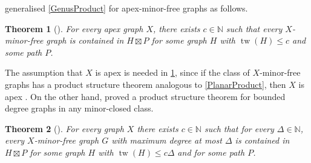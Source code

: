 \documentclass{patmorin}
\theoremstyle{plain}
\newtheorem{thm}{Theorem}
\theoremstyle{definition}
\newcommand{\note}[2]{\noindent{\color{red}[#1:~#2]}}
\DeclareMathOperator{\tw}{tw}
\renewcommand{\SS}{\mathcal{S}}
\renewcommand{\geq}{\geqslant}
\renewcommand{\leq}{\leqslant}
\begin{document}
\citet{DJMMUW20} generalised \cref{GenusProduct} for apex-minor-free graphs as follows.

\begin{thm}[\citep{DJMMUW20}]
\label{ApexMinorFree}
For every apex graph $X$, there exists $c\in\mathbb{N}$ such that every $X$-minor-free graph is contained in $H\boxtimes P$ for some graph $H$ with $\tw(H)\leq c$ and some path $P$.
\end{thm}

The assumption that $X$ is apex is needed in \cref{ApexMinorFree}, since if the class of $X$-minor-free graphs has a product structure theorem analogous to \cref{PlanarProduct}, then $X$ is apex \citep{DJMMUW20}. On the other hand, \citet{DEMWW22} proved a product structure theorem for bounded degree graphs in any minor-closed class.

\begin{thm}[\citep{DEMWW22}]
	\label{MinorFreeDegree}
	For every graph $X$ there exists $c\in\mathbb{N}$ such that for every $\Delta\in\mathbb{N}$, every $X$-minor-free graph $G$ with maximum degree at most $\Delta$ is contained in $H\boxtimes P$ for some graph $H$ with $\tw(H) \leq c\Delta$ and for some path $P$.
\end{thm}

%
%
%
%
\end{document}

